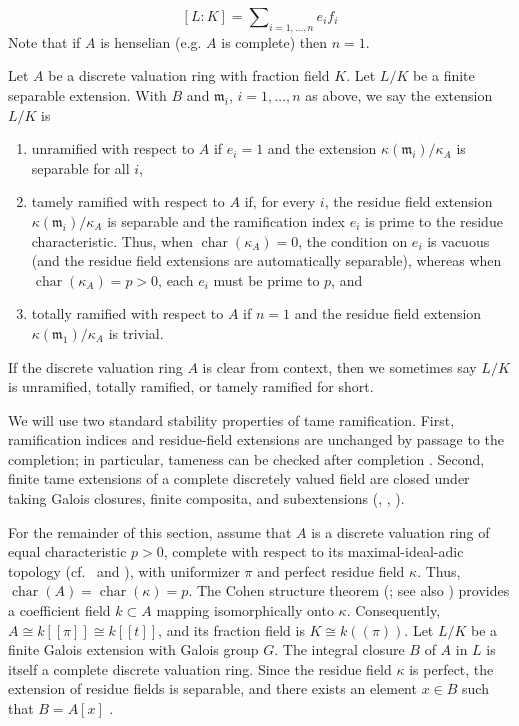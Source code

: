 \[ [L : K] = \sum \nolimits _{i = 1, \ldots , n} e_ i f_ i \]
Note that if $A$ is henselian (e.g. $A$ is complete) then $n=1$.

\begin{definition}[\stackstag{09E9}]\label{definition:tamely_ramified_dvrs}
Let $A$ be a discrete valuation ring with fraction field $K$. Let $L/K$ be a finite separable extension. With $B$ and $\mathfrak m_ i$, $i = 1, \ldots , n$
as above, we say the extension $L/K$ is
\begin{enumerate}
    \item unramified with respect to $A$ if $e_ i = 1$ and the extension $\kappa (\mathfrak m_ i)/\kappa _ A$ is separable for all $i$,
    \item tamely ramified with respect to $A$ if, for every $i$, the residue field extension
    $\kappa(\mathfrak m_i)/\kappa_A$ is separable and the ramification index $e_i$ is prime to
    the residue characteristic. Thus, when $\operatorname{char}(\kappa_A)=0$, the condition on
    $e_i$ is vacuous (and the residue field extensions are automatically separable), whereas when
    $\operatorname{char}(\kappa_A)=p>0$, each $e_i$ must be prime to $p$, and
    \item totally ramified with respect to $A$ if $n = 1$ and the residue field extension $\kappa (\mathfrak m_1)/\kappa _ A$ is trivial.
\end{enumerate}
If the discrete valuation ring $A$ is clear from context, then we sometimes say $L/K$ is unramified, totally ramified, or tamely ramified for short.
\end{definition}

We will use two standard stability properties of tame ramification. First,
ramification indices and residue-field extensions are unchanged by passage to
the completion; in particular, tameness can be checked after completion
\cite[Chapter~II, \S3, Theorem~1]{serreLF}. Second, finite tame extensions of a complete
discretely valued field are closed under taking Galois closures, finite
composita, and subextensions (, ,
).

For the remainder of this section, assume that $A$ is a discrete valuation ring of equal characteristic
$p>0$, complete with respect to its maximal-ideal-adic topology (cf.\  and
), with uniformizer $\pi$ and perfect residue field $\kappa$. Thus,
$\operatorname{char}(A)=\operatorname{char}(\kappa)=p$. The Cohen structure theorem
(; see also ) provides a coefficient field $k\subset A$ mapping
isomorphically onto $\kappa$. Consequently, $A\cong k[[\pi]]\cong k[[t]]$, and its fraction field is
$K\cong k((\pi))$.
Let $L/K$ be a finite Galois extension with Galois group $G$.
The integral closure $B$ of $A$ in $L$ is itself a complete discrete valuation ring.
Since the residue field $\kappa$ is perfect, the extension of residue fields is separable, and there exists an element
$x \in B$ such that $B = A[x]$ \cite[Chapter~III, \S6, Proposition~12]{serreLF}.

